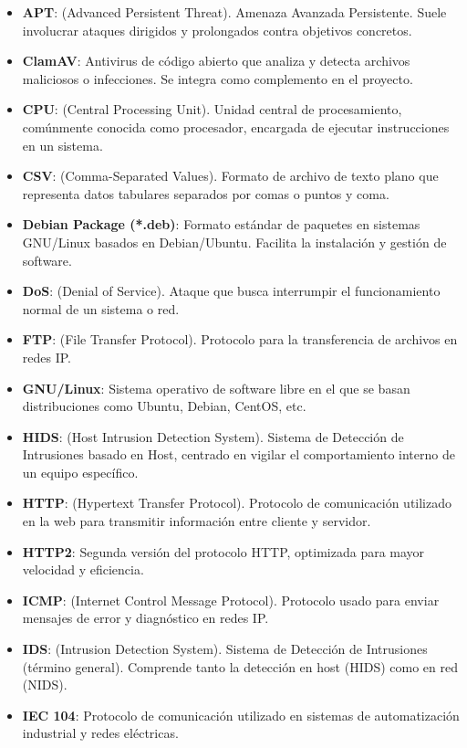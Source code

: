 \documentclass[11pt,a4paper,twoside]{report}
\begin{document}
\begin{itemize}
	\item \textbf{APT}: (Advanced Persistent Threat). Amenaza Avanzada Persistente. Suele involucrar ataques dirigidos y prolongados contra objetivos concretos.
	\item \textbf{ClamAV}: Antivirus de código abierto que analiza y detecta archivos maliciosos o infecciones. Se integra como complemento en el proyecto.
	\item \textbf{CPU}: (Central Processing Unit). Unidad central de procesamiento, comúnmente conocida como procesador, encargada de ejecutar instrucciones en un sistema.
	\item \textbf{CSV}: (Comma-Separated Values). Formato de archivo de texto plano que representa datos tabulares separados por comas o puntos y coma.
	\item \textbf{Debian Package (*.deb)}: Formato estándar de paquetes en sistemas GNU/Linux basados en Debian/Ubuntu. Facilita la instalación y gestión de software.
	\item \textbf{DoS}: (Denial of Service). Ataque que busca interrumpir el funcionamiento normal de un sistema o red.
	\item \textbf{FTP}: (File Transfer Protocol). Protocolo para la transferencia de archivos en redes IP.
	\item \textbf{GNU/Linux}: Sistema operativo de software libre en el que se basan distribuciones como Ubuntu, Debian, CentOS, etc.
	\item \textbf{HIDS}: (Host Intrusion Detection System). Sistema de Detección de Intrusiones basado en Host, centrado en vigilar el comportamiento interno de un equipo específico.
	\item \textbf{HTTP}: (Hypertext Transfer Protocol). Protocolo de comunicación utilizado en la web para transmitir información entre cliente y servidor.
	\item \textbf{HTTP2}: Segunda versión del protocolo HTTP, optimizada para mayor velocidad y eficiencia.
	\item \textbf{ICMP}: (Internet Control Message Protocol). Protocolo usado para enviar mensajes de error y diagnóstico en redes IP.
	\item \textbf{IDS}: (Intrusion Detection System). Sistema de Detección de Intrusiones (término general). Comprende tanto la detección en host (HIDS) como en red (NIDS).
	\item \textbf{IEC 104}: Protocolo de comunicación utilizado en sistemas de automatización industrial y redes eléctricas.

\end{itemize}
\end{document}
